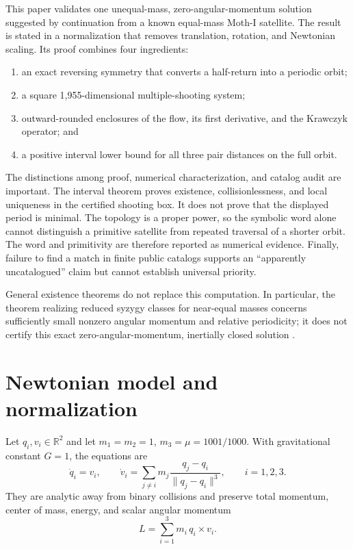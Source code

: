 \documentclass[11pt]{article}
\newcommand{\R}{\mathbb{R}}
\newcommand{\cross}{\mathbin{\times}}
\begin{document}
This paper validates one unequal-mass, zero-angular-momentum solution suggested by continuation from a known equal-mass Moth-I satellite. The result is stated in a normalization that removes translation, rotation, and Newtonian scaling. Its proof combines four ingredients:
\begin{enumerate}
  \item an exact reversing symmetry that converts a half-return into a periodic orbit;
  \item a square 1,955-dimensional multiple-shooting system;
  \item outward-rounded enclosures of the flow, its first derivative, and the Krawczyk operator; and
  \item a positive interval lower bound for all three pair distances on the full orbit.
\end{enumerate}

The distinctions among proof, numerical characterization, and catalog audit are important. The interval theorem proves existence, collisionlessness, and local uniqueness in the certified shooting box. It does not prove that the displayed period is minimal. The topology is a proper power, so the symbolic word alone cannot distinguish a primitive satellite from repeated traversal of a shorter orbit. The word and primitivity are therefore reported as numerical evidence. Finally, failure to find a match in finite public catalogs supports an ``apparently uncatalogued'' claim but cannot establish universal priority.

General existence theorems do not replace this computation. In particular, the theorem realizing reduced syzygy classes for near-equal masses concerns sufficiently small nonzero angular momentum and relative periodicity; it does not certify this exact zero-angular-momentum, inertially closed solution \cite{moeckel-montgomery-2015}.

\section{Newtonian model and normalization}

Let $q_i,v_i\in\R^2$ and let $m_1=m_2=1$, $m_3=\mu=1001/1000$. With gravitational constant $G=1$, the equations are
\begin{equation}
  \dot q_i=v_i,\qquad
  \dot v_i=\sum_{j\ne i}m_j\frac{q_j-q_i}{\lVert q_j-q_i\rVert^3},
  \qquad i=1,2,3. \label{eq:newton}
\end{equation}
They are analytic away from binary collisions and preserve total momentum, center of mass, energy, and scalar angular momentum
\begin{equation}
  L=\sum_{i=1}^3m_i\,q_i\cross v_i . \label{eq:angular}
\end{equation}
\end{document}
